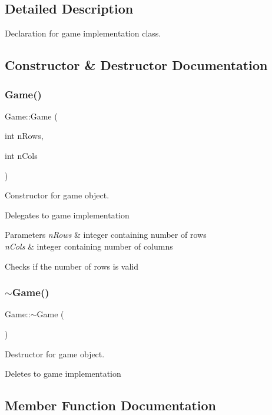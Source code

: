 \subsection{Detailed Description}
Declaration for game implementation class. 

\subsection{Constructor \& Destructor Documentation}
\mbox{\label{class_game_a848102f31ba288bac7aa39db4378db7a}} 
\subsubsection{\texorpdfstring{Game()}{Game()}}
{\footnotesize\ttfamily Game\+::\+Game (\begin{DoxyParamCaption}\item[{int}]{n\+Rows,  }\item[{int}]{n\+Cols }\end{DoxyParamCaption})}



Constructor for game object. 

Delegates to game implementation 
\begin{DoxyParams}{Parameters}
{\em n\+Rows} & integer containing number of rows \\
\hline
{\em n\+Cols} & integer containing number of columns \\
\hline
\end{DoxyParams}
Checks if the number of rows is valid \mbox{\label{class_game_ae3d112ca6e0e55150d2fdbc704474530}} 
\subsubsection{\texorpdfstring{$\sim$\+Game()}{~Game()}}
{\footnotesize\ttfamily Game\+::$\sim$\+Game (\begin{DoxyParamCaption}{ }\end{DoxyParamCaption})}



Destructor for game object. 

Deletes to game implementation 

\subsection{Member Function Documentation}
\mbox{\label{class_game_a3ac4fd5a820cafec68f05cc81c26492a}} 
